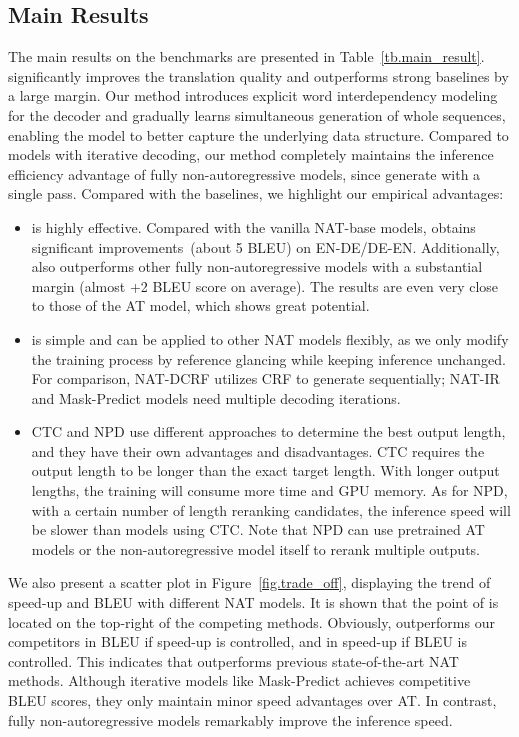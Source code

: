 \subsection{Main Results}
The main results on the benchmarks are presented in Table~\ref{tb.main_result}.
\method significantly improves the translation quality and outperforms strong baselines by a large margin.
Our method introduces explicit word interdependency modeling for the decoder and gradually learns simultaneous generation of whole sequences, enabling the model to better capture the underlying data structure. 
Compared to models with iterative decoding, our method completely maintains the inference efficiency advantage of fully non-autoregressive models, since \method generate with a single pass.
Compared with the baselines, we highlight our empirical advantages:
\begin{itemize}
    \item \method is highly effective. Compared with the vanilla NAT-base models, \method obtains significant improvements~(about 5 BLEU) on EN-DE/DE-EN. Additionally, \method also outperforms other fully non-autoregressive models with a substantial margin (almost +2 BLEU score on average). The results are even very close to those of the AT model, which shows great potential.
    
\item \method is simple and can be applied to other NAT models flexibly, as we only modify the training process by reference glancing while keeping inference unchanged. For comparison, NAT-DCRF utilizes CRF to generate sequentially; NAT-IR and Mask-Predict models need multiple decoding iterations.
    
    \item CTC and NPD use different approaches to determine the best output length, and they have their own advantages and disadvantages. CTC requires the output length to be longer than the exact target length. With longer output lengths, the training will consume more time and GPU memory. As for NPD, with a certain number of length reranking candidates, the inference speed will be slower than models using CTC. Note that NPD can use pretrained AT models or the non-autoregressive model itself to rerank multiple outputs.
\end{itemize}

We also present a scatter plot in Figure~\ref{fig.trade_off}, displaying the trend of speed-up and BLEU with different NAT models.
It is shown that the point of \method is located on the top-right of the competing methods.
Obviously, \method outperforms our competitors in BLEU if speed-up is controlled, and in speed-up if BLEU is controlled.
This indicates that \method outperforms previous state-of-the-art NAT methods.
Although iterative models like Mask-Predict achieves competitive BLEU scores, they only maintain minor speed advantages over AT. In contrast, fully non-autoregressive models remarkably improve the inference speed.

